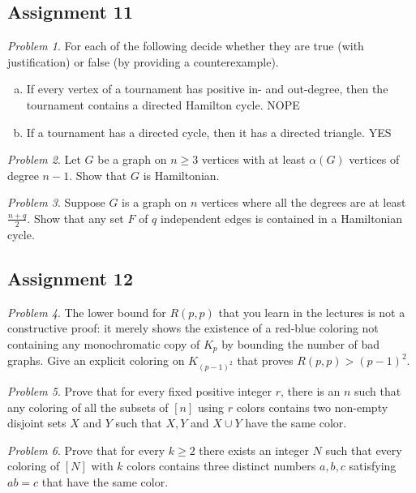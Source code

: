 \documentclass[11pt, fleqn, a4paper, landscape]{article}
\theoremstyle{plain} %
\theoremstyle{remark} %
\newtheorem{problem}{Problem}
\theoremstyle{definition} %
\begin{document}
\begin{multicols}{3}
\subsection{Assignment 11}

\begin{problem}
For each of the following decide whether they are true (with justification) or false (by providing a counterexample).
\begin{enumerate}[(a)]
\item If every vertex of a tournament has positive in- and out-degree, then the tournament contains a directed Hamilton cycle. NOPE
\item If a tournament has a directed cycle, then it has a directed triangle. YES
\end{enumerate} 
\end{problem}

\begin{problem}
Let $G$ be a graph on $n \ge 3$ vertices with at least $\alpha(G)$ vertices of degree $n- 1$. Show that $G$ is Hamiltonian.
\end{problem}

\begin{problem}
Suppose $G$ is a graph on $n$ vertices where all the degrees are at least $\frac{n+q}{2}$. Show that any set $F$ of $q$ independent edges is contained in a Hamiltonian cycle.
\end{problem}

\subsection{Assignment 12}

\begin{problem}
The lower bound for $R(p, p)$ that you learn in the lectures is not a constructive proof: it merely shows the existence of a red-blue coloring not containing any monochromatic copy of $K_p$ by bounding the number of bad graphs. Give an explicit coloring on $K_{(p-1)^2}$ that proves $R(p, p) > (p - 1)^2$.
\end{problem}

\begin{problem}
Prove that for every fixed positive integer $r$, there is an $n$ such that any coloring of all the subsets of $[n] $ using $r$ colors contains two non-empty disjoint sets $X$ and $Y$ such that $X, Y $ and $X \cup Y$ have the same color.
\end{problem}

\begin{problem}
Prove that for every $k \ge 2$ there exists an integer $N$ such that every coloring of $[N]$ with $k$ colors contains three distinct numbers $a, b, c$ satisfying $ab = c$ that have the same color.
\end{problem}


\end{multicols}
\end{document}
